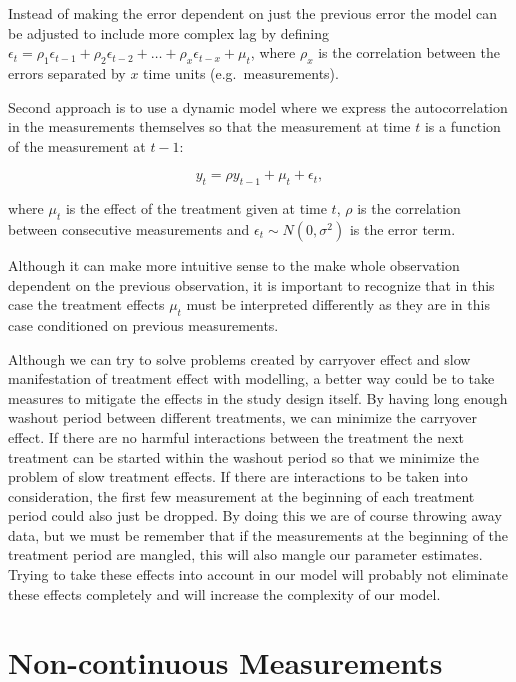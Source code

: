 \documentclass[12pt,a4paper,leqno]{report}
\theoremstyle{plain}
\theoremstyle{definition}
\theoremstyle{remark}
\begin{document}
Instead of making the error dependent on just the previous error the model can be adjusted
to include more complex lag by defining \(\epsilon_t = \rho_1\epsilon_{t-1} +
\rho_2\epsilon_{t-2} + \ldots + \rho_x\epsilon_{t-x} + \mu_t\), where \(\rho_x\) is the correlation
between the errors separated by \(x\) time units (e.g.\ measurements).

Second approach is to use a dynamic model where we express the autocorrelation in the measurements
themselves so that the measurement at time \(t\) is a function of the measurement at \(t-1\):

\begin{def}\label{}
    \begin{equation}\label{}
        y_t = \rho y_{t-1} + \mu_t + \epsilon_t,
    \end{equation}
\end{def}where \(\mu_t\) is the effect of the treatment given at time \(t\), \(\rho \) is the correlation
between consecutive measurements and \(\epsilon_t \sim N(0,\sigma^2)\) is the error term.

Although it can make more intuitive sense to the make whole observation dependent on
the previous observation, it is important to recognize that in this case the treatment effects
\(\mu_t\) must be interpreted differently as they are in this case conditioned on
previous measurements.

Although we can try to solve problems created by carryover effect and slow manifestation
of treatment effect with modelling, a better way could be to take
measures to mitigate the effects in the study design itself. By having long
enough washout period between different treatments, we can minimize the carryover effect. If
there are no harmful interactions between the treatment the next treatment
can be started within the washout period so that we minimize the problem of
slow treatment effects. If there are interactions to be taken into
consideration, the first few measurement at the beginning of
each treatment period could also just be dropped. By doing this we are of course
throwing away data, but we must be remember that if the measurements at the
beginning of the treatment period are mangled, this will also mangle our parameter estimates.
Trying to take these effects into account in our model will probably not eliminate these
effects completely and will increase the complexity of our model.

\section{Non-continuous Measurements}\label{noncontinuous}
\end{document}
